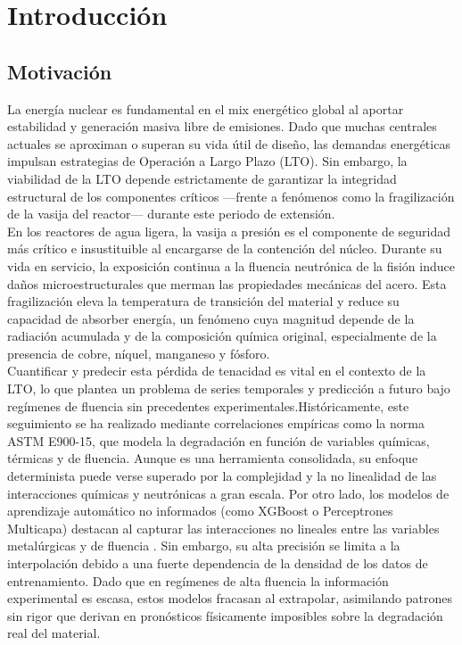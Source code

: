 \documentclass[a4paper, 12pt, twocolumn]{book}
\begin{document}
\chapter{Introducción}

\section{Motivación}

La energía nuclear es fundamental en el mix energético global al aportar estabilidad y generación masiva libre de emisiones. Dado que muchas centrales actuales se aproximan o superan su vida útil de diseño, las demandas energéticas impulsan estrategias de Operación a Largo Plazo (LTO). Sin embargo, la viabilidad de la LTO depende estrictamente de garantizar la integridad estructural de los componentes críticos —frente a fenómenos como la fragilización de la vasija del reactor— durante este periodo de extensión.\\

En los reactores de agua ligera, la vasija a presión es el componente de seguridad más crítico e insustituible al encargarse de la contención del núcleo. Durante su vida en servicio, la exposición continua a la fluencia neutrónica de la fisión induce daños microestructurales que merman las propiedades mecánicas del acero. Esta fragilización eleva la temperatura de transición del material y reduce su capacidad de absorber energía, un fenómeno cuya magnitud depende de la radiación acumulada y de la composición química original, especialmente de la presencia de cobre, níquel, manganeso y fósforo.\\

Cuantificar y predecir esta pérdida de tenacidad es vital en el contexto de la LTO, lo que plantea un problema de series temporales y predicción a futuro bajo regímenes de fluencia sin precedentes experimentales.Históricamente, este seguimiento se ha realizado mediante correlaciones empíricas como la norma ASTM E900-15, que modela la degradación en función de variables químicas, térmicas y de fluencia. Aunque es una herramienta consolidada, su enfoque determinista puede verse superado por la complejidad y la no linealidad de las interacciones químicas y neutrónicas a gran escala. Por otro lado, los modelos de aprendizaje automático no informados (como XGBoost o Perceptrones Multicapa) destacan al capturar las interacciones no lineales entre las variables metalúrgicas y de fluencia \parencite{liu2022machine}. Sin embargo, su alta precisión se limita a la interpolación debido a una fuerte dependencia de la densidad de los datos de entrenamiento. Dado que en regímenes de alta fluencia la información experimental es escasa, estos modelos fracasan al extrapolar, asimilando patrones sin rigor que derivan en pronósticos físicamente imposibles sobre la degradación real del material.\\
\end{document}
